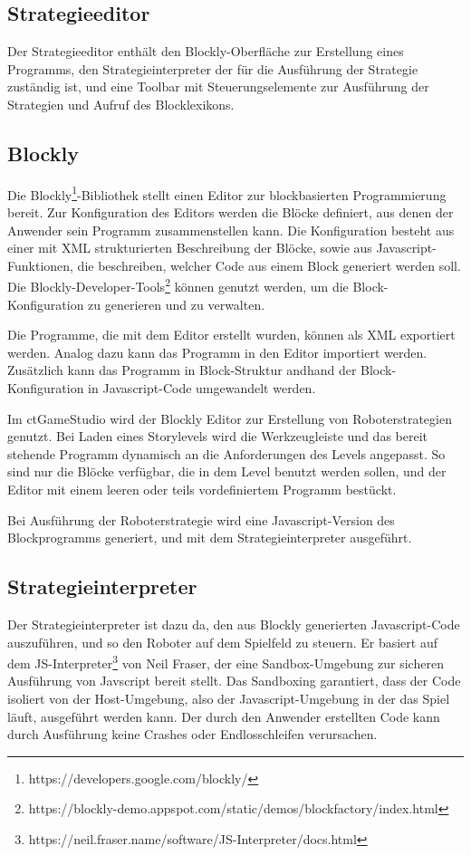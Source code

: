 \subsection{Strategieeditor}

Der Strategieeditor enthält den Blockly-Oberfläche zur Erstellung eines Programms, den
Strategieinterpreter der für die Ausführung der Strategie zuständig ist, und eine Toolbar mit
Steuerungselemente zur Ausführung der Strategien und Aufruf des Blocklexikons.

\subsection{Blockly}

Die Blockly\footnote{https://developers.google.com/blockly/}-Bibliothek stellt einen Editor zur
blockbasierten Programmierung bereit. Zur Konfiguration des Editors werden die Blöcke
definiert, aus denen der Anwender sein Programm zusammenstellen kann. Die Konfiguration besteht aus
einer mit XML strukturierten Beschreibung der Blöcke, sowie aus Javascript-Funktionen, die
beschreiben, welcher Code aus einem Block generiert werden soll.  Die
Blockly-Developer-Tools\footnote{https://blockly-demo.appspot.com/static/demos/blockfactory/index.html}
können genutzt werden, um die Block-Konfiguration zu generieren und zu verwalten.

Die Programme, die mit dem Editor erstellt wurden, können als XML exportiert werden. Analog dazu
kann das Programm in den Editor importiert werden. Zusätzlich kann das Programm in Block-Struktur
andhand der Block-Konfiguration in Javascript-Code umgewandelt werden.

Im ctGameStudio wird der Blockly Editor zur Erstellung von Roboterstrategien genutzt. Bei Laden
eines Storylevels wird die Werkzeugleiste und das bereit stehende Programm dynamisch an die
Anforderungen des Levels angepasst. So sind nur die Blöcke verfügbar, die in dem Level benutzt
werden sollen, und der Editor mit einem leeren oder teils vordefiniertem Programm bestückt.

Bei Ausführung der Roboterstrategie wird eine Javascript-Version des Blockprogramms generiert, und
mit dem Strategieinterpreter ausgeführt.

\subsection{Strategieinterpreter}

Der Strategieinterpreter ist dazu da, den aus Blockly generierten Javascript-Code auszuführen, und
so den Roboter auf dem Spielfeld zu steuern. Er basiert auf dem
JS-Interpreter\footnote{https://neil.fraser.name/software/JS-Interpreter/docs.html} von Neil Fraser,
der eine Sandbox-Umgebung zur sicheren Ausführung von Javscript bereit stellt. Das Sandboxing
garantiert, dass der Code isoliert von der Host-Umgebung, also der Javascript-Umgebung in der das
Spiel läuft, ausgeführt werden kann. Der durch den Anwender erstellten Code kann durch Ausführung
keine Crashes oder Endlosschleifen verursachen.

